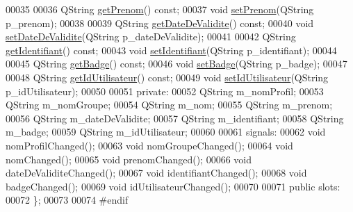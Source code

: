 \begin{DoxyCode}
00035 
00036     QString \hyperlink{class_utilisateur_armoire_a000f0cfe0e184a298c74a5eddc39bee7}{getPrenom}() const;
00037     \textcolor{keywordtype}{void} \hyperlink{class_utilisateur_armoire_a26a7087617a276ff5c4e349bda5fed5a}{setPrenom}(QString p\_prenom);
00038 
00039     QString \hyperlink{class_utilisateur_armoire_a83c5fad292be7c94e38fc14a5feeae7f}{getDateDeValidite}() const;
00040     \textcolor{keywordtype}{void} \hyperlink{class_utilisateur_armoire_abe51b503b17f3d90c7ebe0546ed39cc0}{setDateDeValidite}(QString p\_dateDeValidite);
00041 
00042     QString \hyperlink{class_utilisateur_armoire_a1ba08f24dedbe82671ae4e2930748f31}{getIdentifiant}() const;
00043     \textcolor{keywordtype}{void} \hyperlink{class_utilisateur_armoire_ad1ebf69b10f99b062631a92a3f0ebd2b}{setIdentifiant}(QString p\_identifiant);
00044 
00045     QString \hyperlink{class_utilisateur_armoire_a22e301861ac1c932d47727ae02a17181}{getBadge}() const;
00046     \textcolor{keywordtype}{void} \hyperlink{class_utilisateur_armoire_afee7add8e43ae142c815f0d14491b01e}{setBadge}(QString p\_badge);
00047 
00048     QString \hyperlink{class_utilisateur_armoire_a6a37ddd972e4de9db1cf3b4caa1d1755}{getIdUtilisateur}() const;
00049     \textcolor{keywordtype}{void} \hyperlink{class_utilisateur_armoire_a51fa6e41f395f6bbe1c3b763eaa93dee}{setIdUtilisateur}(QString p\_idUtilisateur);
00050 
00051 private:
00052     QString m\_nomProfil;
00053     QString m\_nomGroupe;
00054     QString m\_nom;
00055     QString m\_prenom;
00056     QString m\_dateDeValidite;
00057     QString m\_identifiant;
00058     QString m\_badge;
00059     QString m\_idUtilisateur;
00060 
00061 signals:
00062     \textcolor{keywordtype}{void} nomProfilChanged();
00063     \textcolor{keywordtype}{void} nomGroupeChanged();
00064     \textcolor{keywordtype}{void} nomChanged();
00065     \textcolor{keywordtype}{void} prenomChanged();
00066     \textcolor{keywordtype}{void} dateDeValiditeChanged();
00067     \textcolor{keywordtype}{void} identifiantChanged();
00068     \textcolor{keywordtype}{void} badgeChanged();
00069     \textcolor{keywordtype}{void} idUtilisateurChanged();
00070 
00071 public slots:
00072 \};
00073 
00074 \textcolor{preprocessor}{#endif}
\end{DoxyCode}
